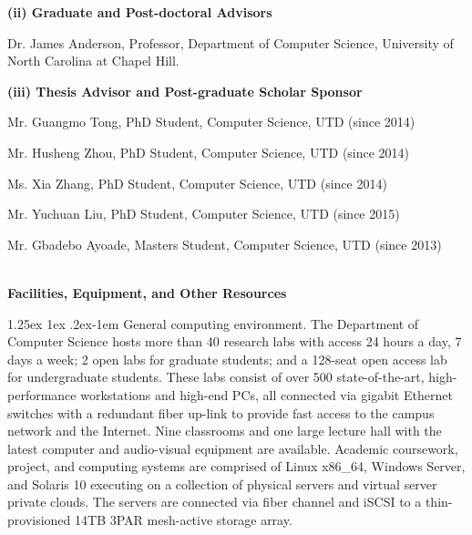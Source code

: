 \documentclass[10pt,letterpaper]{article}
\makeatletter
\renewcommand{\paragraph}{%
  \@startsection{paragraph}{4}%
  {\z@}{1.25ex \@plus 1ex \@minus .2ex}{-1em}%
  {\normalfont\normalsize\bfseries}%
}
\makeatother
\begin{document}
	\hspace{-4mm} \textbf{(ii) Graduate and Post-doctoral Advisors}\  
	\begin{changemargin}{8mm}{2mm}
	Dr. James Anderson, Professor, Department of Computer Science, University of North Carolina at Chapel Hill.
	\end{changemargin}
	
	\hspace{-4mm} \textbf{(iii) Thesis Advisor and Post-graduate Scholar Sponsor}\  
	\begin{changemargin}{8mm}{2mm}

	Mr. Guangmo Tong, PhD Student, Computer Science, UTD (since 2014)
		
	Mr. Husheng Zhou, PhD Student, Computer Science, UTD (since 2014)	
	
	Ms. Xia Zhang, PhD Student, Computer Science, UTD (since 2014)	
	
	Mr. Yuchuan Liu, PhD Student, Computer Science, UTD (since 2015)

	Mr. Gbadebo Ayoade, Masters Student, Computer Science, UTD (since 2013)	

	\end{changemargin}


\newpage
\pagenumbering{gobble}

\begin{center}
\Large{\textbf{\\Facilities, Equipment, and Other Resources}}
\end{center}

\paragraph{General computing environment.} The Department of Computer Science hosts more than 40 research labs with access 24 hours a day, 7 days a week; 2 open labs for graduate students; and a 128-seat open access lab for undergraduate students. These labs consist of over 500 state-of-the-art, high-performance workstations and high-end PCs, all connected via gigabit Ethernet switches with a redundant fiber up-link to provide fast access to the campus network and the Internet. Nine classrooms and one large lecture hall with the latest computer and audio-visual equipment are available. Academic coursework, project, and computing systems are comprised of Linux x86\_64, Windows Server, and Solaris 10 executing on a collection of physical servers and virtual server private clouds. The servers are connected via fiber channel and iSCSI to a thin-provisioned 14TB 3PAR mesh-active storage array. 
\end{document}
